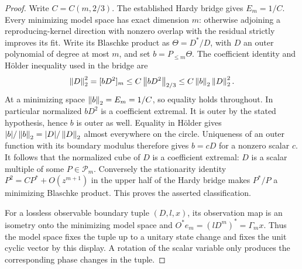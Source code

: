 \begin{proof}
Write $C=C(m,2/3)$.  The established Hardy bridge gives
$E_m=1/C$.  Every minimizing model space has exact dimension $m$:
otherwise adjoining a reproducing-kernel direction with nonzero
overlap with the residual strictly improves its fit.  Write its
Blaschke product as $\Theta=D^*/D$, with $D$ an outer polynomial of
degree at most $m$, and set $b=P_{\le m}\Theta$.
The coefficient identity and H\"older inequality used in the bridge
are
\begin{equation}
 \left\lVert D\right\rVert_2^2=[bD^2]_m
 \le C\left\lVert bD^2\right\rVert_{2/3}
 \le C\left\lVert b\right\rVert_2\left\lVert D\right\rVert_2^2.
 \label{I:R:eq:classification-Holder-chain}
\end{equation}
At a minimizing space $\left\lVert b\right\rVert_2=E_m=1/C$, so equality holds
throughout.  In particular normalized $bD^2$ is a coefficient
extremal.  It is outer by the stated hypothesis, hence $b$ is outer
as well.  Equality in H\"older gives
$|b|/\left\lVert b\right\rVert_2=|D|/\left\lVert D\right\rVert_2$ almost everywhere on the circle.
Uniqueness of an outer function with its boundary modulus therefore
gives $b=cD$ for a nonzero scalar $c$.  It follows that the normalized
cube of $D$ is a coefficient extremal: $D$ is a scalar multiple of
some $P\in\mathcal P_m$.  Conversely the stationarity identity
$P^2=C P^*+O(z^{m+1})$ in the upper half of the Hardy bridge makes
$P^*/P$ a minimizing Blaschke product.  This proves the asserted
classification.

For a lossless observable boundary tuple $(D,l,x)$, its observation
map is an isometry onto the minimizing model space and
$O^*e_m=(lD^m)^*=\Gamma_m x$.  Thus the model space fixes the tuple
up to a unitary state change and fixes the unit cyclic vector by this
display.  A rotation of the scalar variable only produces the
corresponding phase changes in the tuple.
\end{proof}
